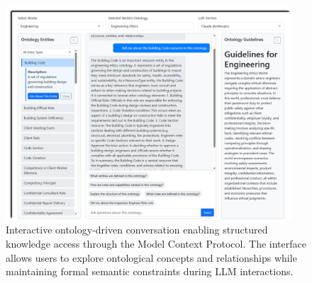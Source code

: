 \documentclass[sigconf,anonymous]{acmart}
\begin{document}
\begin{figure}[htp]
  \centering
  \includegraphics[width=0.95\textwidth]{images/ontology_chat.png}
  \caption{Interactive ontology-driven conversation enabling structured knowledge access through the Model Context Protocol. The interface allows users to explore ontological concepts and relationships while maintaining formal semantic constraints during LLM interactions.}
  \label{fig:ontology_chat}
\end{figure}



%
%
\end{document}
